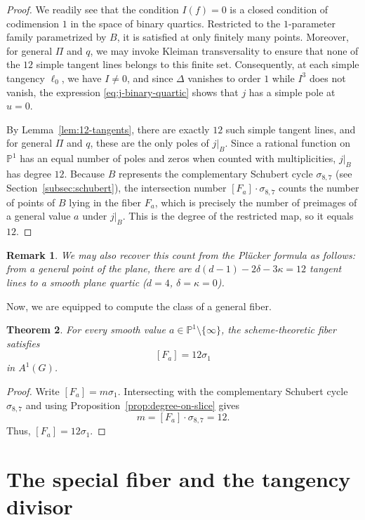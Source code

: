 \documentclass[11pt]{article}
\newtheorem{theorem}{Theorem}[section]
\newtheorem{remark}[theorem]{Remark}
\newcommand{\Pj}{\mathbb P}
\begin{document}
\begin{proof}
We readily see that the condition $I(f)=0$ is a closed condition of codimension $1$ in the space of binary quartics. Restricted to the $1$-parameter family parametrized by $B$, it is satisfied at only finitely many points. Moreover, for general $\Pi$ and $q$, we may invoke Kleiman transversality \cite{Kleiman} to ensure that none of the $12$ simple tangent lines belongs to this finite set. Consequently, at each simple tangency $\ell_0$, we have $I\neq 0$, and since $\Delta$ vanishes to order $1$ while $I^3$ does not vanish, the expression \eqref{eq:j-binary-quartic} shows that $j$ has a simple pole at $u=0$.

By Lemma~\ref{lem:12-tangents}, there are exactly $12$ such simple tangent lines, and for general $\Pi$ and $q$, these are the only poles of $j|_B$. Since a rational function on $\Pj^1$ has an equal number of poles and zeros when counted with multiplicities, $j|_B$ has degree $12$. Because $B$ represents the complementary Schubert cycle $\sigma_{8,7}$ (see Section~\ref{subsec:schubert}), the intersection number $[F_a]\cdot \sigma_{8,7}$ counts the number of points of $B$ lying in the fiber $F_a$, which is precisely the number of preimages of a general value $a$ under $j|_B$. This is the degree of the restricted map, so it equals $12$.
\end{proof}

\begin{remark}
We may also recover this count from the Pl\"ucker formula as follows: from a general point of the plane, there are $d(d-1)-2\delta-3\kappa=12$ tangent lines to a smooth plane quartic ($d=4$, $\delta=\kappa=0$). 
\end{remark}

Now, we are equipped to compute the class of a general fiber. 

\begin{theorem}\label{thm:general-fiber-class}
For every smooth value $a\in \Pj^1\setminus\{\infty\}$, the
scheme-theoretic fiber satisfies
\[
[F_a]=12\sigma_1
\]
in $A^1(G)$.
\end{theorem}

\begin{proof}
Write $[F_a]=m\sigma_1$. Intersecting with the complementary Schubert cycle $\sigma_{8,7}$ and using Proposition~\ref{prop:degree-on-slice} gives
\[
m = [F_a]\cdot \sigma_{8,7}=12.
\]
Thus, $[F_a]=12\sigma_1$.
\end{proof}

\section{The special fiber and the tangency divisor}
\end{document}
